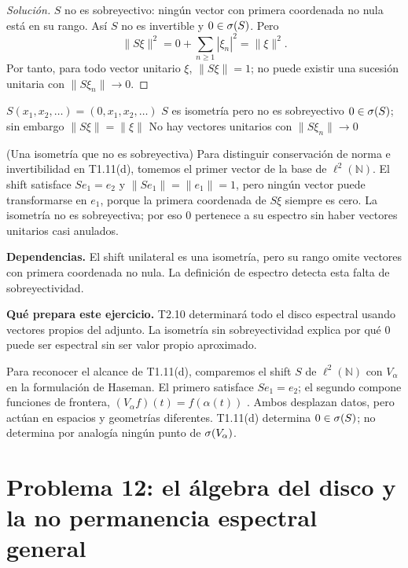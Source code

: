 \begin{proof}[Solución]
$S$ no es sobreyectivo: ningún vector con primera coordenada no nula está en su rango. Así $S$ no
es invertible y $0\in\sigma(S)$. Pero
\[
 \|S\xi\|^2=0+\sum_{n\ge1}|\xi_n|^2=\|\xi\|^2.
\]
Por tanto, para todo vector unitario $\xi$, $\|S\xi\|=1$; no puede existir una sucesión unitaria con
$\|S\xi_n\|\to0$.
\end{proof}

\proofdiagram
{$S(x_1,x_2,\dots)=(0,x_1,x_2,\dots)$}
{$S$ es isometría pero no es sobreyectivo}
{$0\in\sigma(S)$; sin embargo $\|S\xi\|=\|\xi\|$}
{No hay vectores unitarios con $\|S\xi_n\|\to0$}

\begin{cthejemplo}{(Una isometría que no es sobreyectiva)}
Para distinguir conservación de norma e invertibilidad en T1.11(d), tomemos el primer
vector de la base de $\ell^2(\mathbb N)$.
El shift satisface $Se_1=e_2$ y $\|Se_1\|=\|e_1\|=1$, pero ningún vector puede
transformarse en $e_1$, porque la primera coordenada de $S\xi$ siempre es cero.
La isometría no es sobreyectiva; por eso $0$ pertenece a su espectro sin haber vectores
unitarios casi anulados.
\end{cthejemplo}

\noindent\textbf{Dependencias.} El shift unilateral es una isometría, pero su rango omite vectores con primera coordenada no nula. La definición de espectro detecta esta falta de sobreyectividad.

\noindent\textbf{Qué prepara este ejercicio.} T2.10 determinará todo el disco espectral usando vectores propios del adjunto. La isometría sin sobreyectividad explica por qué $0$ puede ser espectral sin ser valor propio aproximado.

\begin{investigacion}[title={Dos shifts en espacios distintos}]
Para reconocer el alcance de T1.11(d), comparemos el shift $S$ de $\ell^2(\mathbb N)$ con
$V_\alpha$ en la formulación de Haseman. El primero satisface $Se_1=e_2$; el segundo
compone funciones de frontera, $(V_\alpha f)(t)=f(\alpha(t))$
\cite[pp.~463--464, ecs.~(1.1)--(1.2)]{Karlovich2017}.
Ambos desplazan datos, pero actúan en espacios y geometrías diferentes. T1.11(d)
determina $0\in\sigma(S)$; no determina por analogía ningún punto de $\sigma(V_\alpha)$.
\end{investigacion}

\section{Problema 12: el álgebra del disco y la no permanencia espectral general}

